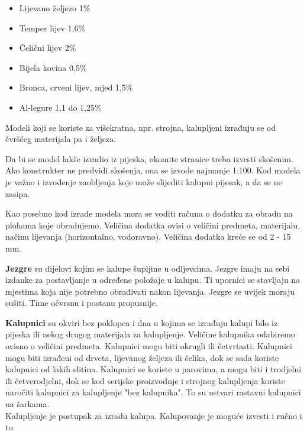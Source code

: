 \documentclass[a4paper,12pt]{article}
\numberwithin{figure}{section}
\begin{document}
\begin{itemize}
\item Lijevano željezo 1$\%$
\item Temper lijev 1,6$\%$
\item Čelični lijev 2$\%$
\item Bijela kovina 0,5$\%$
\item Bronca, crveni lijev, mjed 1,5$\%$
\item Al-legure 1,1 do 1,25$\%$
\end{itemize}
Modeli koji se koriste za višekratna, npr. strojna, kalupljeni izrađuju se od čvršćeg materijala pa i željeza. \par
Da bi se model lakše izvadio iz pijeska, okomite stranice treba izvesti skošenim. Ako konstrukter ne predvidi skošenja, ona se izvode najmanje 1:100. Kod modela je važno i izvođenje zaobljenja koje može slijediti kalupni pijesak, a da se ne zasipa.\par
Kao posebno kod izrade modela mora se voditi računa o dodatku za obradu na plohama koje obrađujemo. Veličina dodatka ovisi o veličini predmeta, materijalu, načinu lijevanja (horizontalno, vodoravno). Veličina dodatka kreće se od 2 - 15 mm.\par
\textbf{Jezgre} su dijelovi kojim se kalupe šupljine u odljevcima. Jezgre imaju na sebi izdanke za postavljanje u određene položaje u kalupu. Ti upornici se stavljaju na mjestima koja nije potrebno obrađivati nakon lijevanja. Jezgre se uvijek moraju sušiti. Time očvrsnu i postanu propusnije.\par
\textbf{Kalupnici} su okviri bez poklopca i dna u kojima se izrađuju kalupi bilo iz pijeska ili nekog drugog materijala za kalupljenje. Veličine kalupnika odabiremo ovisno o veličini predmeta. Kalupnici mogu biti okrugli ili četvrtasti. Kalupnici mogu biti izrađeni od drveta, lijevanog željeza ili čelika, dok se sada koriste kalupnici od lakih slitina. Kalupnici se koriste u parovima, a mogu biti i trodjelni ili četverodjelni, dok se kod serijske proizvodnje i strojnog kalupljenja koriste naročiti kalupnici za kalupljenje "bez kalupnika". To su ustvari rastavni kalupnici na šarkama.\\
Kalupljenje je postupak za izradu kalupa. Kalupovanje je moguće izvesti i ručno i to:
\end{document}
